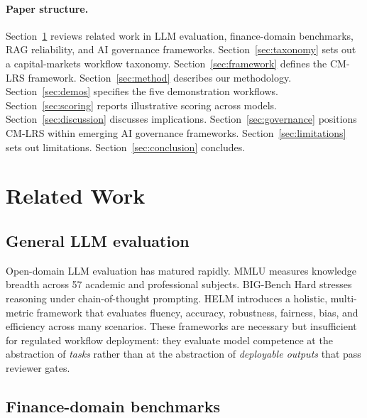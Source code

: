 \documentclass[11pt]{article}
\begin{document}
\paragraph{Paper structure.} Section~\ref{sec:related} reviews related work in LLM evaluation, finance-domain benchmarks, RAG reliability, and AI governance frameworks. Section~\ref{sec:taxonomy} sets out a capital-markets workflow taxonomy. Section~\ref{sec:framework} defines the CM-LRS framework. Section~\ref{sec:method} describes our methodology. Section~\ref{sec:demos} specifies the five demonstration workflows. Section~\ref{sec:scoring} reports illustrative scoring across models. Section~\ref{sec:discussion} discusses implications. Section~\ref{sec:governance} positions CM-LRS within emerging AI governance frameworks. Section~\ref{sec:limitations} sets out limitations. Section~\ref{sec:conclusion} concludes.

\section{Related Work}
\label{sec:related}

\subsection{General LLM evaluation}

Open-domain LLM evaluation has matured rapidly. MMLU \citep{hendrycks2021mmlu} measures knowledge breadth across 57 academic and professional subjects. BIG-Bench Hard \citep{suzgun2022bbh} stresses reasoning under chain-of-thought prompting. HELM \citep{liang2022helm} introduces a holistic, multi-metric framework that evaluates fluency, accuracy, robustness, fairness, bias, and efficiency across many scenarios. These frameworks are necessary but insufficient for regulated workflow deployment: they evaluate model competence at the abstraction of \emph{tasks} rather than at the abstraction of \emph{deployable outputs} that pass reviewer gates.

\subsection{Finance-domain benchmarks}
\end{document}
